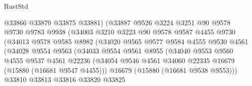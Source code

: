 \begin{lexlean}{RustStd}
\begin{coremodule}
                              @33866
                              @33870
                              @33875
                              @33881)
                            (@33887
                              @9526
                              @3224
                              @3251
                              @90
                              @9578
                              @9730
                              @9783
                              @9938
                              (@34003
                                @3210
                                @3223
                                @90
                                @9578
                                @9587
                                @4455
                                @9730
                                (@34013
                                  @9578
                                  @9585
                                  @8982
                                  (@34020
                                    @9565
                                    @9577
                                    @9584
                                    @4555
                                    @9530
                                    @4561
                                    (@34028
                                      @9554
                                      @9563
                                      (@34033
                                        @9554
                                        @9561
                                        @8955
                                        (@34040
                                          @9553
                                          @9560
                                          @4555
                                          @9537
                                          @4561
                                          @22236
                                          (@34054
                                            @9546
                                            @4561
                                            @34060
                                            @22335
                                            @16679
                                            (@15880 (@16681 @9547 @4455)))
                                          @16679
                                          (@15880 (@16681 @9538 @9553)))
                                        @33810
                                        @33813
                                        @33816
                                        @33820
                                        @33825

\end{coremodule}
\end{lexlean}
